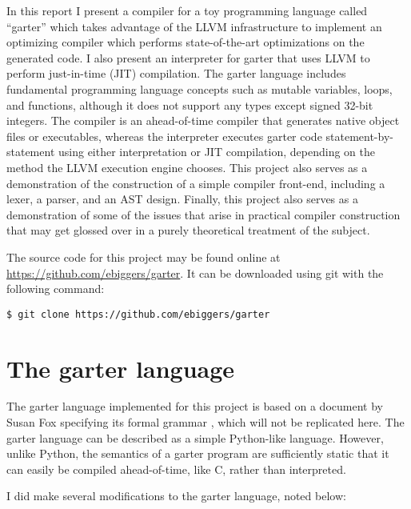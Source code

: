 \documentclass[11pt]{article}
\begin{document}
In this report I present a compiler for a toy programming language called
``garter'' which takes advantage of the LLVM infrastructure to implement an
optimizing compiler which performs state-of-the-art optimizations on the
generated code.  I also present an interpreter for garter that uses LLVM to
perform just-in-time (JIT) compilation.  The garter language includes
fundamental programming language concepts such as mutable variables, loops, and
functions, although it does not support any types except signed 32-bit integers.
The compiler is an ahead-of-time compiler that generates native object files or
executables, whereas the interpreter executes garter code statement-by-statement
using either interpretation or JIT compilation, depending on the method the LLVM
execution engine chooses.  This project also serves as a demonstration of the
construction of a simple compiler front-end, including a lexer, a parser, and an
AST design.  Finally, this project also serves as a demonstration of some of the
issues that arise in practical compiler construction that may get glossed over
in a purely theoretical treatment of the subject.

The source code for this project may be found online at
\url{https://github.com/ebiggers/garter}.  It can be downloaded using git with
the following command:

\begin{verbatim}
$ git clone https://github.com/ebiggers/garter
\end{verbatim}

\section{The garter language}

The garter language implemented for this project is based on a document by Susan
Fox specifying its formal grammar \cite{garter}, which will not be replicated
here.  The garter language can be described as a simple Python-like
language.  However, unlike Python, the semantics of a garter program are
sufficiently static that it can easily be compiled ahead-of-time, like C, rather
than interpreted.

I did make several modifications to the garter language, noted below:
\end{document}
